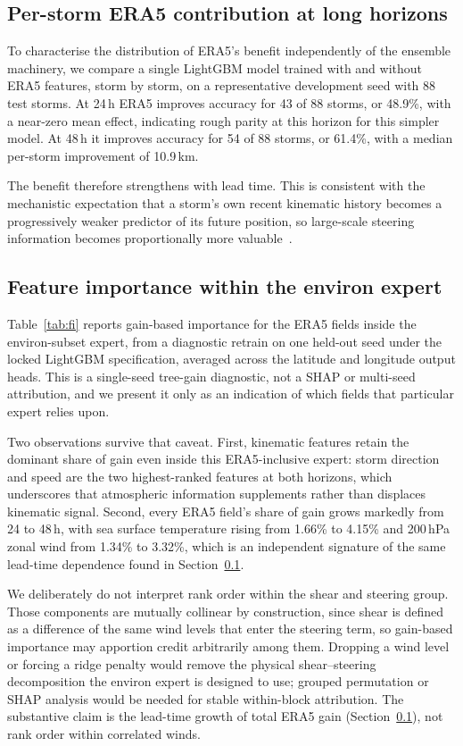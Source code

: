 \documentclass[10pt,twocolumn,a4paper]{article}
\newcommand{\era}{ERA5}
\begin{document}
\subsection{Per-storm ERA5 contribution at long horizons}
\label{sec:diag}
To characterise the distribution of \era{}'s benefit independently of the ensemble
machinery, we compare a single LightGBM model trained with and without \era{}
features, storm by storm, on a representative development seed with 88 test
storms. At 24\,h \era{} improves accuracy for 43 of 88 storms, or 48.9\%, with a
near-zero mean effect, indicating rough parity at this horizon for this simpler
model. At 48\,h it improves accuracy for 54 of 88 storms, or 61.4\%, with a median
per-storm improvement of 10.9\,km.

The benefit therefore strengthens with lead time. This is consistent with the
mechanistic expectation that a storm's own recent kinematic history becomes a
progressively weaker predictor of its future position, so large-scale steering
information becomes proportionally more
valuable~\cite{giffard2020tropical,goerss2004tropical}.

\subsection{Feature importance within the environ expert}
\label{sec:fi}
Table~\ref{tab:fi} reports gain-based importance for the \era{} fields inside the
environ-subset expert, from a diagnostic retrain on one held-out seed under the
locked LightGBM specification, averaged across the latitude and longitude output
heads. This is a single-seed tree-gain diagnostic, not a SHAP or multi-seed
attribution, and we present it only as an indication of which fields that
particular expert relies upon.

Two observations survive that caveat. First, kinematic features retain the
dominant share of gain even inside this \era{}-inclusive expert: storm direction
and speed are the two highest-ranked features at both horizons, which underscores
that atmospheric information supplements rather than displaces kinematic signal.
Second, every \era{} field's share of gain grows markedly from 24 to 48\,h, with
sea surface temperature rising from 1.66\% to 4.15\% and 200\,hPa zonal wind from
1.34\% to 3.32\%, which is an independent signature of the same lead-time
dependence found in Section~\ref{sec:diag}.

We deliberately do not interpret rank order within the shear and steering group.
Those components are mutually collinear by construction, since shear is defined as
a difference of the same wind levels that enter the steering term, so gain-based
importance may apportion credit arbitrarily among them. Dropping a wind level or
forcing a ridge penalty would remove the physical shear--steering decomposition the
environ expert is designed to use; grouped permutation or SHAP analysis would be
needed for stable within-block attribution. The substantive claim is the
lead-time growth of total \era{} gain (Section~\ref{sec:diag}), not rank order
within correlated winds.
\end{document}
